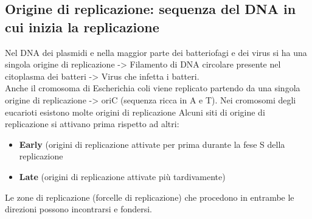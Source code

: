 \documentclass{article}
\begin{document}
\subsection{Origine di replicazione: sequenza del DNA in cui inizia la replicazione} Nel DNA dei plasmidi e nella maggior parte dei batteriofagi e dei virus si ha una singola origine di replicazione -> Filamento di DNA circolare presente nel citoplasma dei batteri -> Virus che infetta i batteri. 
\\[1ex]
Anche il cromosoma di Escherichia coli viene replicato partendo da una singola origine di replicazione -> oriC (sequenza ricca in A e T). 
Nei cromosomi degli eucarioti esistono molte origini di replicazione 
Alcuni siti di origine di replicazione si attivano prima rispetto ad altri:
\begin{itemize}
    \item \textbf{Early} (origini di replicazione attivate per prima durante la fese S della replicazione 
    \item \textbf{Late} (origini di replicazione attivate più tardivamente) 
\end{itemize}

Le zone di replicazione (forcelle di replicazione) che procedono in entrambe le direzioni possono incontrarsi e fondersi. 
\end{document}

